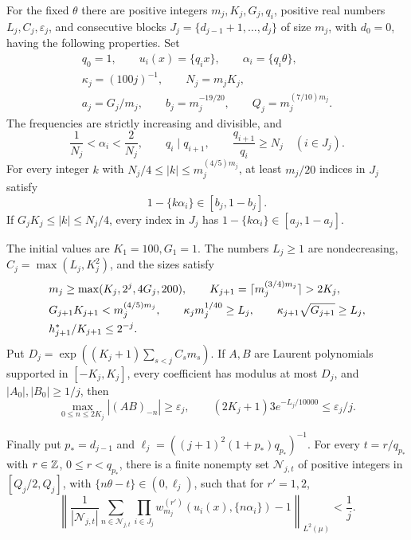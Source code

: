 \begin{proposition}\label{prop:parameters}
For the fixed $\theta$ there are positive integers $m_j,K_j,G_j,q_i$,
positive real numbers $L_j,C_j,\varepsilon_j$, and consecutive blocks
$J_j=\{d_{j-1}+1,\ldots,d_j\}$ of size $m_j$, with $d_0=0$, having
the following properties.  Set
\begin{gather*}
 q_0=1,\qquad u_i(x)=\{q_ix\},\qquad\alpha_i=\{q_i\theta\},\\
 \kappa_j=(100j)^{-1},\qquad N_j=m_jK_j,\\
 a_j=G_j/m_j,\qquad b_j=m_j^{-19/20},\qquad Q_j=m_j^{(7/10)m_j}.
\end{gather*}
The frequencies are strictly increasing and divisible, and
\begin{equation}\label{eq:phases}
 \frac1{N_j}<\alpha_i<\frac2{N_j},\qquad
 q_i\mid q_{i+1},\qquad \frac{q_{i+1}}{q_i}\ge N_j
 \quad(i\in J_j).
\end{equation}
For every integer $k$ with $N_j/4\le |k|\le m_j^{(4/5)m_j}$, at least
$m_j/20$ indices in $J_j$ satisfy
\begin{equation}\label{eq:spread}
 1-\{k\alpha_i\}\in[b_j,1-b_j].
\end{equation}
If $G_jK_j\le |k|\le N_j/4$, every index in $J_j$ has
$1-\{k\alpha_i\}\in[a_j,1-a_j]$.

The initial values are $K_1=100,G_1=1$.  The numbers $L_j\ge1$ are
nondecreasing, $C_j=\max(L_j,K_j^2)$, and the sizes satisfy
\begin{align}\label{eq:scales}
 &m_j\ge\max(K_j,2^j,4G_j,200),\qquad
 K_{j+1}=\lceil m_j^{(3/4)m_j}\rceil>2K_j,\notag\\
 &G_{j+1}K_{j+1}<m_j^{(4/5)m_j},\qquad
 \kappa_jm_j^{1/40}\ge L_j,\qquad
 \kappa_{j+1}\sqrt{G_{j+1}}\ge L_j,\notag\\
 &h_{j+1}^*/K_{j+1}\le2^{-j}.
\end{align}
Put $D_j=\exp((K_j+1)\sum_{s<j}C_sm_s)$.  If $A,B$ are Laurent
polynomials supported in $[-K_j,K_j]$, every coefficient has modulus at
most $D_j$, and $|A_0|,|B_0|\ge1/j$, then
\begin{equation}\label{eq:polynomial}
 \max_{0\le n\le2K_j}|(AB)_{-n}|\ge\varepsilon_j,
 \qquad
 (2K_j+1)3e^{-L_j/10000}\le\varepsilon_j/j.
\end{equation}

Finally put $p_*=d_{j-1}$ and
$\ell_j=((j+1)^2(1+p_*)q_{p_*})^{-1}$.
For every $t=r/q_{p_*}$ with $r\in\mathbb Z$, $0\le r<q_{p_*}$, there is a finite nonempty set
$\mathcal N_{j,t}$ of positive integers in $[Q_j/2,Q_j]$, with
$\{n\theta-t\}\in(0,\ell_j)$, such that for $r'=1,2$,
\begin{equation}\label{eq:sampling}
 \left\|\frac1{|\mathcal N_{j,t}|}\sum_{n\in\mathcal N_{j,t}}
       \prod_{i\in J_j}w_{m_j}^{(r')}(u_i(x),\{n\alpha_i\})-1
       \right\|_{L^2(\mu)}<\frac1j.
\end{equation}
\end{proposition}

